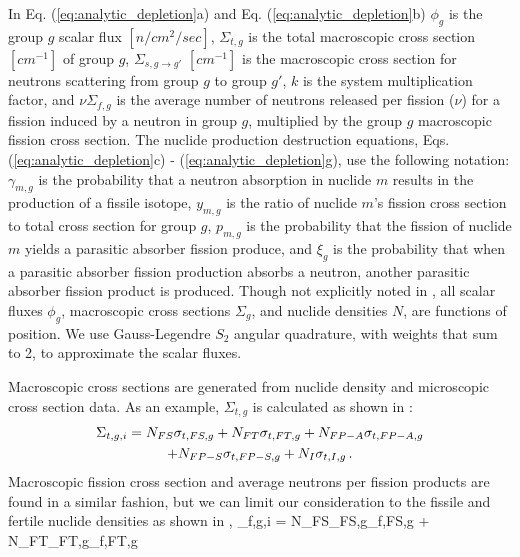 In Eq. (\ref{eq:analytic_depletion}a) and Eq. (\ref{eq:analytic_depletion}b) 
$\phi_g$ is the group $g$ scalar flux $[n/cm^2/sec]$, 
$\Sigma_{t,g}$ is the total macroscopic cross section $[cm^{-1}]$ of group $g$, 
$\Sigma_{s,g \to g'}$ $[cm^{-1}]$ is the macroscopic cross section for neutrons scattering from group $g$ to group $g'$, 
$k$ is the system multiplication factor, and
$\nu \Sigma_{f,g}$ is the average number of neutrons released per fission ($\nu$) for a fission induced by a neutron in group $g$, multiplied by the group $g$ macroscopic fission cross section.
The nuclide production destruction equations, Eqs. (\ref{eq:analytic_depletion}c) - (\ref{eq:analytic_depletion}g), use the following notation:
$\gamma_{m,g}$ is the probability that a neutron absorption in nuclide $m$ results in the production of a fissile isotope, 
$y_{m,g}$ is the  ratio of nuclide $m$'s fission cross section to total cross section for group $g$,
%
$p_{m,g}$ is the probability that the fission of nuclide $m$ yields a parasitic absorber fission produce,
and $\xi_g$ is the probability that when a parasitic absorber fission production absorbs a neutron, another parasitic absorber fission product is produced.
Though not explicitly noted in , all scalar fluxes $\phi_g$, macroscopic cross sections $\Sigma_g$, and nuclide densities $N$, are functions of position.  We use Gauss-Legendre $S_2$ angular quadrature, with weights that sum to 2, to approximate the scalar fluxes.

Macroscopic cross sections are generated from nuclide density and microscopic cross section data.
As an example, $\Sigma_{t,g}$ is calculated as  shown in :
\begin{multline}
\Sigma_{t,g,i} = N_{FS}\sigma_{t,FS,g} + N_{FT}\sigma_{t,FT,g} + N_{FP-A}\sigma_{t,FP-A,g} 
\\ + N_{FP-S}\sigma_{t,FP-S,g} + N_{I}\sigma_{t,I,g} \, .
\label{eq:sigt_macro}
\end{multline}
Macroscopic fission cross section and average neutrons per fission products are found in a similar fashion, but we can limit our consideration to the fissile and fertile nuclide densities as shown in ,
\benum
\label{eq:nu_sigf_macro}
\nu\Sigma_{f,g,i} = N_{FS}\nu_{FS,g}\sigma_{f,FS,g} +  N_{FT}\nu_{FT,g}\sigma_{f,FT,g}  \pep
\eenum

